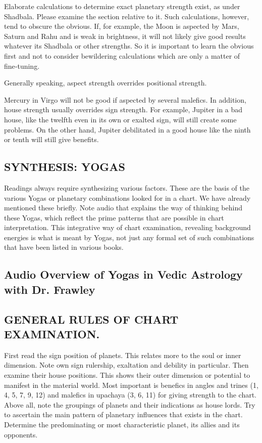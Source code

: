Elaborate calculations to determine exact planetary strength exist, as under Shadbala. Please examine the section relative to it. Such calculations, however, tend to obscure the obvious. If, for example, the Moon is aspected by Mars, Saturn and Rahu and is weak in brightness, it will not likely give good results whatever its Shadbala or other strengths. So it is important to learn the obvious first and not to consider bewildering calculations which are only a matter of fine‑tuning.

 

Generally speaking, aspect strength overrides positional strength.
 

Mercury in Virgo will not be good if aspected by several malefics. In addition, house strength usually overrides sign strength. For example, Jupiter in a bad house, like the twelfth even in its own or exalted sign, will still create some problems. On the other hand, Jupiter debilitated in a good house like the ninth or tenth will still give benefits.

 

\subsection{SYNTHESIS: YOGAS}

 

Readings always require synthesizing various factors. These are the basis of the various Yogas or planetary combinations looked for in a chart. We have already mentioned these briefly. Note audio that explains the way of thinking behind these Yogas, which reflect the prime patterns that are possible in chart interpretation. This integrative way of chart examination, revealing background energies is what is meant by Yogas, not just any formal set of such combinations that have been listed in various books.



\subsection{\textbf{Audio Overview of Yogas in Vedic Astrology with Dr. Frawley}}
 

\subsection{GENERAL RULES OF CHART EXAMINATION.}

 

First read the sign position of planets. This relates more to the soul or inner dimension. Note own sign rulership, exaltation and debility in particular.
Then examine their house positions. This shows their outer dimension or potential to manifest in the material world. Most important is benefics in angles and trines (1, 4, 5, 7, 9, 12) and malefics in upachaya (3, 6, 11) for giving strength to the chart.
Above all, note the groupings of planets and their indications as house lords.
Try to ascertain the main pattern of planetary influences that exists in the chart. Determine the predominating or most characteristic planet, its allies and its opponents.
 

